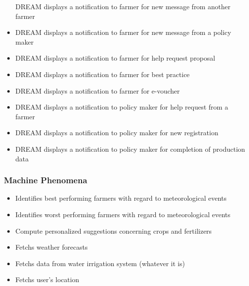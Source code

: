 \begin{itemize}
	DREAM displays a notification to farmer for new message from another farmer
	\item
	DREAM displays a notification to farmer for new message from a policy maker
	\item
	DREAM displays a notification to farmer for help request proposal
	\item
	DREAM displays a notification to farmer for best practice
	\item
	DREAM displays a notification to farmer for e-voucher
	\item
	DREAM displays a notification to policy maker for help request from a farmer
	\item
	DREAM displays a notification to policy maker for new registration
	\item
	DREAM displays a notification to policy maker for completion of production data
	
\end{itemize}

\subsubsection{Machine Phenomena}
\begin{itemize}
	\item 
	Identifies best performing farmers with regard to meteorological events
	\item 
	Identifies worst performing farmers with regard to meteorological events
	\item 
	Compute personalized suggestions concerning crops and fertilizers
	\item 
	Fetchs weather forecasts
	\item 
	Fetchs data from water irrigation system (whatever it is)
	\item 
	Fetchs user's location
	
\end{itemize}